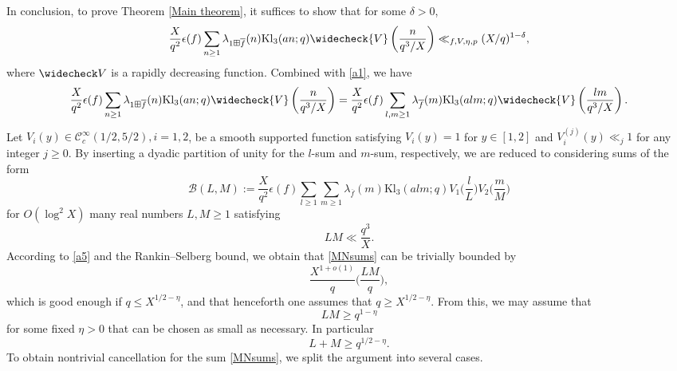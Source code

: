 \documentclass[11pt,reqno]{amsart}
\numberwithin{equation}{section}
\theoremstyle{plain}
\theoremstyle{definition}
\begin{document}
In conclusion, to prove Theorem \ref{Main theorem}, it suffices to show that for some $\delta>0$,
\begin{equation*}
    \label{MNsums1}
    \frac{X}{q^{2}}\epsilon(f)
\sum_{n\geq 1}\lambda_{1\boxplus \overline{f}}(n)
\mathrm{Kl}_3(an;q)
\widecheck{V}\left(\frac{n}{q^3/X}\right)\ll_{f,V,\eta, p}(X/q)^{1-\delta},
\end{equation*}
where $\widecheck V$ is a rapidly decreasing function.
Combined with \eqref{a1}, we have
\begin{equation*}
\begin{split}
\frac{X}{q^{2}}\epsilon(f)
\sum_{n\geq 1}\lambda_{1\boxplus \overline{f}}(n)
\mathrm{Kl}_3(an;q)
\widecheck{V}\left(\frac{n}{q^3/X}\right)=
\frac{X}{q^2}\epsilon(f)\sum_{l,m\geq 1}\lambda_{\overline{f}}(m)
\mathrm{Kl}_3(al m;q)\widecheck{V}\left(\frac{l m}{q^3/X}\right).
\end{split}
\end{equation*}
Let $V_i(y)\in \mathcal{C}_c^\infty(1/2, 5/2), i=1,2$, be a smooth supported function satisfying $V_i(y)=1$ for
$y\in [1,2]$ and $V_i^{(j)}(y)\ll_j 1$ for any integer $j\geq 0$.
By inserting a dyadic partition of unity for the $l$-sum and $m$-sum, respectively, we are reduced to considering sums of the form
\begin{equation}
    \label{MNsums}
   \mathcal{B}(L,M) := \frac{X}{q^2}\epsilon(f)\sum_{l\geq 1}\sum_{m\geq 1}
    \lambda_{\overline{f}}(m)\mathrm{Kl}_3(al m;q)V_1\big(\frac{l}{L}\big)V_2\big(\frac{m}{M}\big)
\end{equation}
for $O(\log^2 X)$ many real numbers $L,M\geq 1$ satisfying
\begin{equation}
    \label{LMupperbound}
    LM\ll \frac{q^3}{X}.
\end{equation}
According to \eqref{a5} and the Rankin--Selberg bound, we obtain that \eqref{MNsums} can be trivially bounded by
\begin{equation*} \label{MNboundtrivial}
    \frac{X^{1+o(1)}}q\big(\frac{LM}{q}\big),
\end{equation*}
which is good enough if $q\leq X^{1/2-\eta}$,
and that henceforth one assumes that $q\geq X^{1/2-\eta}$.
From this, we may assume that
\begin{equation*}\label{LMlower}
    LM\geq q^{1-\eta}
\end{equation*}
for some fixed $\eta>0$ that can be chosen as small as necessary. In particular
$$L+M\geq q^{1/2-\eta}.$$
To obtain nontrivial cancellation for the sum
\eqref{MNsums}, we split the argument into several cases.
\end{document}
